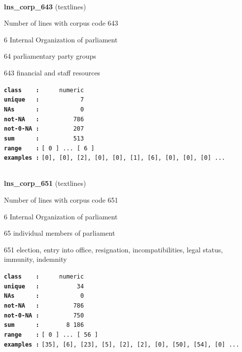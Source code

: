 \documentclass[]{article}
\begin{document}
~

\textbf{lns\_corp\_643} (textlines)

Number of lines with corpus code 643

6 Internal Organization of parliament

64 parliamentary party groups

643 financial and staff resources

\textbf{\texttt{class\ \ \ \ :}} \texttt{~~~~~numeric}\\
\textbf{\texttt{unique\ \ \ :}} \texttt{~~~~~~~~~~~7}\\
\textbf{\texttt{NAs\ \ \ \ \ \ :}} \texttt{~~~~~~~~~~~0}\\
\textbf{\texttt{not-NA\ \ \ :}} \texttt{~~~~~~~~~786}\\
\textbf{\texttt{not-0-NA\ :}} \texttt{~~~~~~~~~207}\\
\textbf{\texttt{sum\ \ \ \ \ \ :}} \texttt{~~~~~~~~~513}\\
\textbf{\texttt{range\ \ \ \ :}}
\texttt{{[}\ 0\ {]}\ ...\ {[}\ 6\ {]}}\\
\textbf{\texttt{examples\ :}}
\texttt{{[}0{]},\ {[}0{]},\ {[}2{]},\ {[}0{]},\ {[}0{]},\ {[}1{]},\ {[}6{]},\ {[}0{]},\ {[}0{]},\ {[}0{]}\ ...}\\

~

\textbf{lns\_corp\_651} (textlines)

Number of lines with corpus code 651

6 Internal Organization of parliament

65 individual members of parliament

651 election, entry into office, resignation, incompatibilities, legal
status, immunity, indemnity

\textbf{\texttt{class\ \ \ \ :}} \texttt{~~~~~numeric}\\
\textbf{\texttt{unique\ \ \ :}} \texttt{~~~~~~~~~~34}\\
\textbf{\texttt{NAs\ \ \ \ \ \ :}} \texttt{~~~~~~~~~~~0}\\
\textbf{\texttt{not-NA\ \ \ :}} \texttt{~~~~~~~~~786}\\
\textbf{\texttt{not-0-NA\ :}} \texttt{~~~~~~~~~750}\\
\textbf{\texttt{sum\ \ \ \ \ \ :}} \texttt{~~~~~~~8~186}\\
\textbf{\texttt{range\ \ \ \ :}}
\texttt{{[}\ 0\ {]}\ ...\ {[}\ 56\ {]}}\\
\textbf{\texttt{examples\ :}}
\texttt{{[}35{]},\ {[}6{]},\ {[}23{]},\ {[}5{]},\ {[}2{]},\ {[}2{]},\ {[}0{]},\ {[}50{]},\ {[}54{]},\ {[}0{]}\ ...}\\
\end{document}
